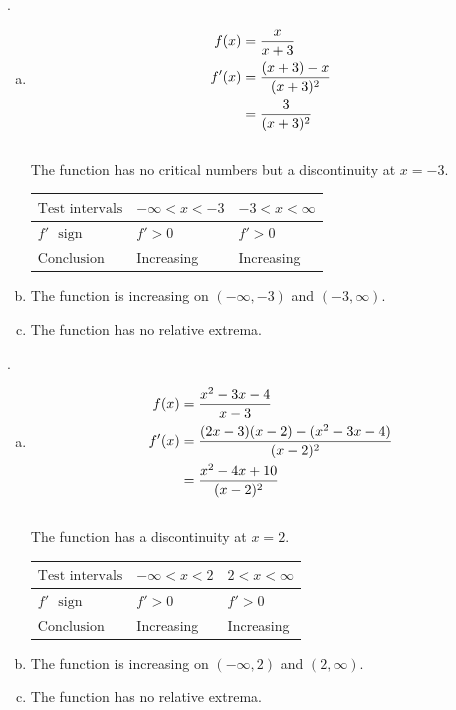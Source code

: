 \documentclass[11pt]{article}
\newcommand*{\vs}{\vspace{1cm}}
\newcommand*{\next}{\noindent}
\newcommand*{\set}{\setcounter{equation}{0}}
\begin{document}
\vs
\next
34.\begin{enumerate}[(a)]
    \item \begin{align}
        \set
        f(x)&=\frac{x}{x+3}\\
        f'(x)&=\frac{(x+3)-x}{(x+3)^2}\\
        &=\frac{3}{(x+3)^2}
    \end{align}\\
    The function has no critical numbers but a discontinuity at $x=-3$.
    \begin{flushleft}
        \begin{table}[h]
                \begin{tabular}{|l|l|l|}
                    \hline
                    $\text{Test intervals}$ & $-\infty<x<-3$ & $-3<x<\infty$\\ \hline
                    $f'\,\,\,\,\text{sign}$ & $f'>0$ & $f'>0$\\ \hline
                    $\text{Conclusion}$ & Increasing & Increasing\\
                    \hline
             \end{tabular}
            \end{table}
        \end{flushleft}
        \item The function is increasing on $(-\infty, -3)$ and $(-3, \infty)$.
        \item The function has no relative extrema.
\end{enumerate}

\vs
\next
38.\begin{enumerate}[(a)]
    \item \begin{align}
        \set
        f(x)&=\frac{x^2-3x-4}{x-3}\\
        f'(x)&=\frac{(2x-3)(x-2)-(x^2-3x-4)}{(x-2)^2}\\
        &=\frac{x^2-4x+10}{(x-2)^2}
    \end{align}\\
    The function has a discontinuity at $x=2$.
    \begin{flushleft}
        \begin{table}[h]
                \begin{tabular}{|l|l|l|}
                    \hline
                    $\text{Test intervals}$ & $-\infty<x<2$ & $2<x<\infty$\\ \hline
                    $f'\,\,\,\,\text{sign}$ & $f'>0$ & $f'>0$\\ \hline
                    $\text{Conclusion}$ & Increasing & Increasing\\
                    \hline
             \end{tabular}
            \end{table}
        \end{flushleft}
        \item The function is increasing on $(-\infty, 2)$ and $(2, \infty)$.
        \item The function has no relative extrema.
\end{enumerate}
\end{document}
